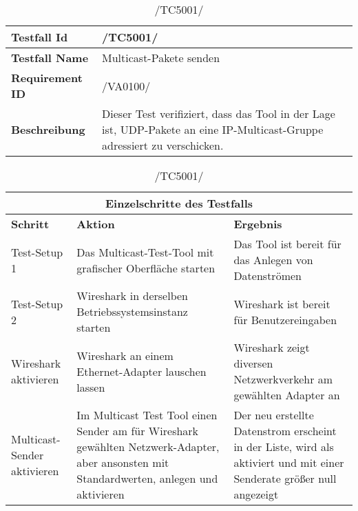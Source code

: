     \begin{table}[h]
        \caption{/TC5001/}
        \label{tab:TC5001}
        \begin{center}
            \begin{tabular}{|p{3.5cm}|p{12cm}|}
                \hline
                    \textbf{Testfall Id} & /TC5001/\\
                \hline
                    \textbf{Testfall Name} & Multicast-Pakete senden\\
                \hline
                    \textbf{Requirement ID} & /VA0100/\\
                \hline
                    \textbf{Beschreibung} & Dieser Test verifiziert, dass das
                    Tool in der Lage ist, UDP-Pakete an eine
                    IP-Multicast-Gruppe adressiert zu verschicken.\\
                \hline
            \end{tabular}
            \begin{tabular}{|p{3.5cm}|p{5cm}|p{6.55cm}|}
                \multicolumn{3}{|c|}{\textbf{Einzelschritte des Testfalls}} \\
                \hline
                    \textbf{Schritt} & \textbf{Aktion} & \textbf{Ergebnis}\\
                \hline
                    Test-Setup 1 &
                    Das Multicast-Test-Tool mit grafischer Oberfläche starten & 
                    Das Tool ist bereit für das Anlegen von Datenströmen \\
                \hline
                    Test-Setup 2 &
                    Wireshark in derselben Betriebssystemsinstanz starten &
                    Wireshark ist bereit für Benutzereingaben \\
                \hline
                    Wireshark aktivieren & Wireshark an einem Ethernet-Adapter
                    lauschen lassen & 
                    Wireshark zeigt diversen Netzwerkverkehr am gewählten
                    Adapter an\\
                \hline
                    Multicast-Sender aktivieren &
                    Im Multicast Test Tool einen Sender am für Wireshark
                    gewählten Netzwerk-Adapter, aber ansonsten mit
                    Standardwerten, anlegen und aktivieren &
                    Der neu erstellte Datenstrom erscheint in der Liste, wird
                    als aktiviert und mit einer Senderate größer null
                    angezeigt\\

\end{tabular}
\end{center}
\end{table}
